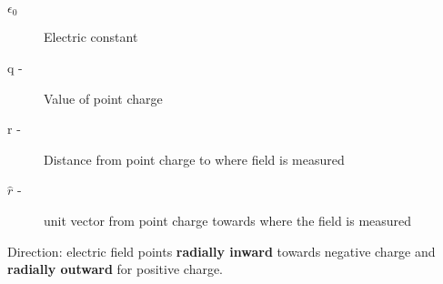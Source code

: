 \begin{description}
	\item[$\epsilon_{0}$] Electric constant
	\item[q -] Value of point charge
	\item[r -] Distance from point charge to where field is measured
	\item[$\hat{r}$ -] unit vector from point charge towards where the field is measured
\end{description}

Direction: electric field points \textbf{radially inward} towards negative charge and
\textbf{radially outward} for positive charge.

\newpage


